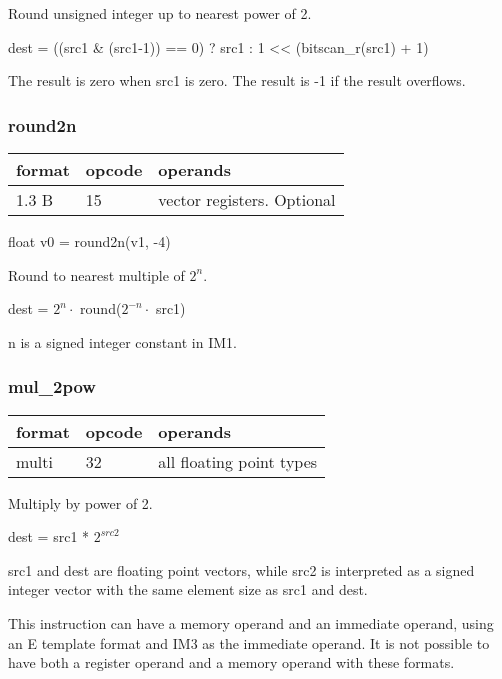 \documentclass[forwardcom.tex]{subfiles}
\begin{document}
Round unsigned integer up to nearest power of 2.

dest = ((src1 \& (src1-1)) == 0) ? src1 : 1 \textless\textless{}  (bitscan\_r(src1) + 1)
\vspace{2mm}

The result is zero when src1 is zero. The result is -1 if the result overflows.

\subsubsection{round2n}
\label{table:round2nInstruction}
\begin{tabular}{|p{12mm}|p{12mm}|p{110mm}|}
\hline
\bfseries format & \bfseries opcode & \bfseries operands \\ \hline
1.3 B & 15 & vector registers. Optional \\ \hline
\end{tabular}
\vspace{2mm}

float v0 = round2n(v1, -4)
\vspace{2mm}

Round to nearest multiple of $2^n$.

dest = $2^n\cdot$ round($2^{-n}\cdot$ src1)

n is a signed integer constant in IM1.
\vspace{2mm}

\subsubsection{mul\_2pow}
\label{table:mul2PosInstruction}
\begin{tabular}{|p{12mm}|p{12mm}|p{110mm}|}
\hline
\bfseries format & \bfseries opcode & \bfseries operands \\ \hline
multi & 32 & all floating point types \\ \hline
\end{tabular}
\vspace{2mm}

Multiply by power of 2.

dest = src1 * $2^{src2}$

src1 and dest are floating point vectors, while src2 is interpreted as a signed integer vector with the same element size as src1 and dest.
\vspace{2mm}

This instruction can have a memory operand and an immediate operand, using an E template format and IM3  as the immediate operand. It is not possible to have both a register operand and a memory operand with these formats.
\vspace{2mm}
\end{document}

